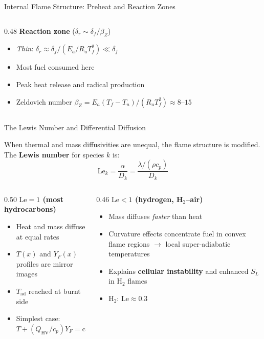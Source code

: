 \documentclass[12pt,aspectratio=169]{beamer}
\newcommand{\Le}{\mathrm{Le}}
\newcommand{\Tad}{T_{\text{ad}}}
\newcommand{\SL}{S_L}
\newcommand{\lf}{\delta_f}
\newcommand{\alphath}{\alpha}
\begin{document}
\begin{frame}{Internal Flame Structure: Preheat and Reaction Zones}
\begin{columns}
\begin{column}{0.48\textwidth}
      \medskip
      \textbf{Reaction zone} ($\delta_r \sim \lf/\beta_Z$)
      \begin{itemize}
        \item \emph{Thin}: $\delta_r \approx \lf / (E_a/R_uT_f^2) \ll \lf$
        \item Most fuel consumed here
        \item Peak heat release and radical production
        \item Zeldovich number $\beta_Z = E_a(T_f - T_u)/(R_u T_f^2)
              \approx 8$--$15$
      \end{itemize}
    \end{column}
  \end{columns}
\end{frame}

\begin{frame}{The Lewis Number and Differential Diffusion}

  When thermal and mass diffusivities are unequal, the flame structure
  is modified.  The \textbf{Lewis number} for species $k$ is:
  \[
    \Le_k = \frac{\alphath}{D_k}
    = \frac{\lambda/(\rho c_p)}{D_k}
  \]

  \begin{columns}[t]
    \begin{column}{0.50\textwidth}
      \textbf{$\Le = 1$ (most hydrocarbons)}
      \begin{itemize}
        \item Heat and mass diffuse at equal rates
        \item $T(x)$ and $Y_F(x)$ profiles are mirror images
        \item $\Tad$ reached at burnt side
        \item Simplest case: $T + (Q_{\text{HV}}/c_p)Y_F = \text{const}$
      \end{itemize}
    \end{column}
    \begin{column}{0.46\textwidth}
      \textbf{$\Le < 1$ (hydrogen, H$_2$--air)}
      \begin{itemize}
        \item Mass diffuses \emph{faster} than heat
        \item Curvature effects concentrate fuel in
              convex flame regions $\to$ local super-adiabatic
              temperatures
        \item Explains \textbf{cellular instability}
              and enhanced $\SL$ in H$_2$ flames
        \item H$_2$: $\Le \approx 0.3$
      \end{itemize}
    \end{column}
  \end{columns}


\end{frame}
\end{document}
